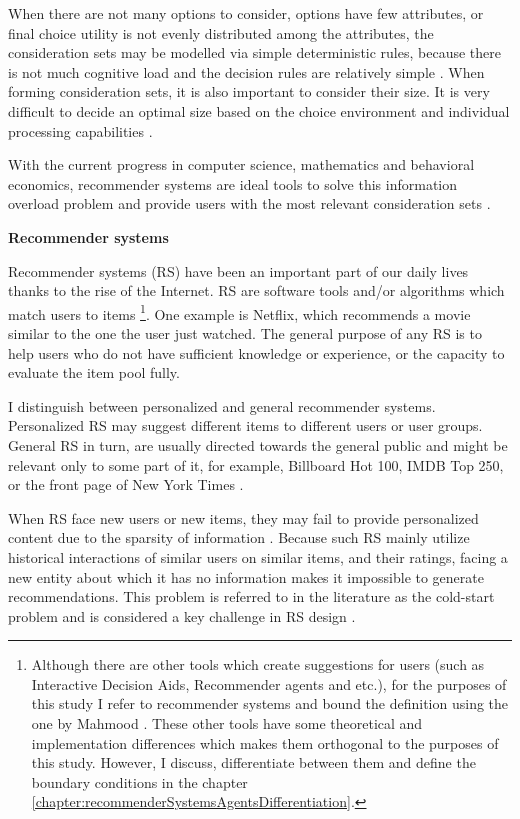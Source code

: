 \documentclass[a4paper,12pt]{article}
\newcommand{\citeyearonly}[1]{\citeyearpar{#1}}
\begin{document}
When there are not many options to consider, options have few attributes, or final choice utility is not evenly distributed among the attributes, the consideration sets may be modelled via simple deterministic rules, because there is not much cognitive load and the decision rules are relatively simple  \citep{lee2004effect, hauser2014consideration} . When forming consideration sets, it is also important to consider their size. It is very difficult to decide an optimal size based on the choice environment and individual processing capabilities \citep{de2011modelling}. 

With the current progress in computer science, mathematics and behavioral economics, recommender systems are ideal tools to solve this information overload problem and provide users with the most relevant consideration sets \citep{breese2013empirical}.

    
\textbf{Recommender systems}    

Recommender systems (RS) have been an important part of our daily lives thanks to the rise of the Internet. RS are software tools and/or algorithms which match users to items \citep{mahmood2009improving} \footnote{Although there are other tools which create suggestions for users (such as Interactive Decision Aids, Recommender agents and etc.), for the purposes of this study I refer to recommender systems and bound the definition using the one by Mahmood \citeyearonly{mahmood2009improving}. These other tools have some theoretical and implementation differences which makes them orthogonal to the purposes of this study. However, I discuss, differentiate between them and define the boundary conditions in the chapter \ref{chapter:recommenderSystemsAgentsDifferentiation}.}. One example is Netflix, which recommends a movie similar to the one the user just watched. The general purpose of any RS is to help users who do not have sufficient knowledge or experience, or the capacity to evaluate the item pool fully. 

I distinguish between personalized and general recommender systems. Personalized RS  may suggest different items to different users or user groups. General RS in turn, are usually directed towards the general public and might be relevant only to some part of it, for example, Billboard Hot 100, IMDB Top 250, or the front page of New York Times \citep{ricci2010recsystems}.

When RS face new users or new items, they may fail to provide personalized content due to the sparsity of information \citep{lika2014facing}. Because such RS mainly utilize historical interactions of similar users on similar items, and their ratings, facing a new entity about which it has no information makes it impossible to generate recommendations. This problem is referred to in the literature as the cold-start problem \citep{adomavicius2005toward} and is considered a key challenge in RS design \citep{park2009pairwise}.
\end{document}
